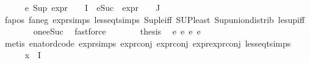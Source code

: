 \begin{isabellebody}
\ \ \ \ \isamarkupfalse%
\ e{}{\isacharcolon}{\kern0pt}\ {\isachardoublequoteopen}{\isacharparenleft}{\kern0pt}Sup\ {\isacharparenleft}{\kern0pt}{\isacharparenleft}{\kern0pt}expr{\isacharunderscore}{\kern0pt}{}\ {\isasymcirc}\ {\isasymPhi}{\isacharparenright}{\kern0pt}\ {\isacharbackquote}{\kern0pt}\ I\ {\isasymunion}\ {\isacharparenleft}{\kern0pt}{\isacharparenleft}{\kern0pt}eSuc\ {\isasymcirc}\ expr{\isacharunderscore}{\kern0pt}{}\ {\isasymcirc}\ {\isasymPhi}{\isacharparenright}{\kern0pt}\ {\isacharbackquote}{\kern0pt}\ J{\isacharparenright}{\kern0pt}{\isacharparenright}{\kern0pt}{\isacharparenright}{\kern0pt}\ {\isacharless}{\kern0pt}{\isacharequal}{\kern0pt}\ {}{\isachardoublequoteclose}\isanewline
\ \ \ \ \ \ \isamarkupfalse%
\ fa{\isacharunderscore}{\kern0pt}pos\ fa{\isacharunderscore}{\kern0pt}neg\ expr{\isachardot}{\kern0pt}simps\ less{\isacharunderscore}{\kern0pt}eq{\isacharunderscore}{\kern0pt}t{\isachardot}{\kern0pt}simps\ Sup{\isacharunderscore}{\kern0pt}le{\isacharunderscore}{\kern0pt}iff\ SUP{\isacharunderscore}{\kern0pt}least\ Sup{\isacharunderscore}{\kern0pt}union{\isacharunderscore}{\kern0pt}distrib\ le{\isacharunderscore}{\kern0pt}sup{\isacharunderscore}{\kern0pt}iff\isanewline
\ \ \ \ \ \ \isamarkupfalse%
\ one{\isacharunderscore}{\kern0pt}eSuc\ \isamarkupfalse%
\ fastforce\isanewline
\ \ \ \ \isamarkupfalse%
\ \isamarkupfalse%
\ {\isacharquery}{\kern0pt}thesis\ \isamarkupfalse%
\ e{}\ e{}\ e{}\ e{}\isanewline
\ \ \ \ \ \ \isamarkupfalse%
\ {\isacharparenleft}{\kern0pt}metis\ enat{\isacharunderscore}{\kern0pt}ord{\isacharunderscore}{\kern0pt}code{\isacharparenleft}{\kern0pt}{}{\isacharparenright}{\kern0pt}\ expr{\isachardot}{\kern0pt}simps\ expr{\isacharunderscore}{\kern0pt}{}{\isacharunderscore}{\kern0pt}conj\ expr{\isacharunderscore}{\kern0pt}{}{\isacharunderscore}{\kern0pt}conj\ expr{\isacharunderscore}{\kern0pt}{}{\isachardot}{\kern0pt}expr{\isacharunderscore}{\kern0pt}{}{\isacharunderscore}{\kern0pt}conj\ less{\isacharunderscore}{\kern0pt}eq{\isacharunderscore}{\kern0pt}t{\isachardot}{\kern0pt}simps{\isacharparenright}{\kern0pt}\isanewline
\ \ \isamarkupfalse%
\isanewline
\ \ \ \ \isamarkupfalse%
\ {\isachardoublequoteopen}{\isasymexists}x{\isasymin}{\isasymPhi}\ {\isacharbackquote}{\kern0pt}\ I{\isachardot}{\kern0pt}\isanewline

\end{isabellebody}
